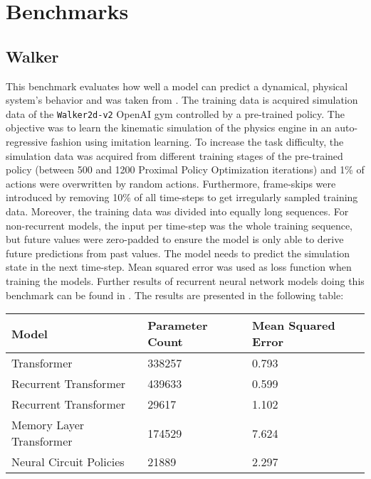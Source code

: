 \documentclass[draft,final]{vutinfth} %
\begin{document}
\section{Benchmarks}
\subsection{Walker}
This benchmark evaluates how well a model can predict a dynamical, physical system's behavior and was taken from \cite{LongTermDependenciesIrregularTimeSeries}.
The training data is acquired simulation data of the \texttt{Walker2d-v2} OpenAI gym \cite{OpenAIGym} controlled by a pre-trained policy.
The objective was to learn the kinematic simulation of the physics engine in an auto-regressive fashion using imitation learning.
To increase the task difficulty, the simulation data was acquired from different training stages of the pre-trained policy (between 500 and 1200 Proximal Policy Optimization iterations) and 1\% of actions were overwritten by random actions.
Furthermore, frame-skips were introduced by removing 10\% of all time-steps to get irregularly sampled training data. 
Moreover, the training data was divided into equally long sequences.
For non-recurrent models, the input per time-step was the whole training sequence, but future values were zero-padded to ensure the model is only able to derive future predictions from past values.
The model needs to predict the simulation state in the next time-step.
Mean squared error was used as loss function when training the models.
Further results of recurrent neural network models doing this benchmark can be found in \cite{LatentODEsIrregularlySampled}.
The results are presented in the following table:
\begin{table}[h]
\begin{tabular}{lll}
\hline
Model & Parameter Count & Mean Squared Error \\ \hline
Transformer & 338257 & 0.793 \\ 
Recurrent Transformer & 439633 & 0.599 \\ 
Recurrent Transformer & 29617 & 1.102 \\ 
Memory Layer Transformer & 174529 & 7.624 \\ 
Neural Circuit Policies & 21889 & 2.297 \\
\end{tabular}
\end{table}
\end{document}
